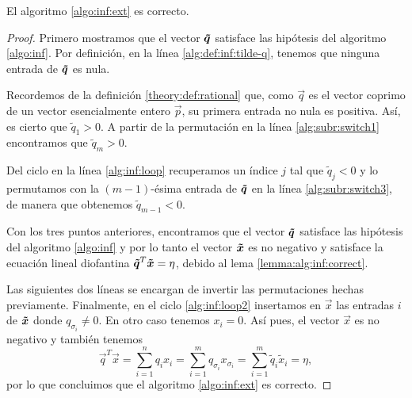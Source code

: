\begin{theorem}
	\label{th:alg:inf}
	El algoritmo \ref{algo:inf:ext} es correcto.
\end{theorem}
\begin{proof}
	Primero mostramos que el vector $\boldsymbol{\tilde{q}}$ satisface las hipótesis del algoritmo
	\ref{algo:inf}. Por definición, en la línea \ref{alg:def:inf:tilde-q}, tenemos que ninguna
	entrada de $\boldsymbol{\tilde{q}}$ es nula.

	Recordemos de la definición \ref{theory:def:rational} que, como $\vec{q}$ es el vector coprimo
	de un vector esencialmente entero $\vec{p}$, su primera entrada no nula es positiva. Así, es
	cierto que $\tilde{q}_1 > 0$. A partir de la permutación en la línea \ref{alg:subr:switch1}
	encontramos que $\tilde{q}_m > 0$.

	Del ciclo en la línea \ref{alg:inf:loop} recuperamos un índice $j$ tal que $\tilde{q}_j < 0$ y
	lo permutamos con la $(m - 1)$-ésima entrada de $\boldsymbol{\tilde{q}}$ en la línea
	\eqref{alg:subr:switch3}, de manera que obtenemos $\tilde{q}_{m-1} < 0$.

	Con los tres puntos anteriores, encontramos que el vector $\boldsymbol{\tilde{q}}$ satisface las
	hipótesis del algoritmo \ref{algo:inf} y por lo tanto el vector $\boldsymbol{\tilde{x}}$ es no negativo
	y satisface la ecuación lineal diofantina $\boldsymbol{\tilde{q}}^T\boldsymbol{\tilde{x}} = \eta$, debido al
	lema \ref{lemma:alg:inf:correct}.

	Las siguientes dos líneas se encargan de invertir las permutaciones hechas previamente.
	Finalmente, en el ciclo \eqref{alg:inf:loop2} insertamos en $\vec{x}$ las entradas $i$ de
	$\boldsymbol{\tilde{x}}$ donde $q_{\sigma_i} \neq 0$. En otro caso tenemos $x_i = 0$. Así pues, el
	vector $\vec{x}$ es no negativo y también tenemos
	\begin{equation*}
		\vec{q}^T\vec{x} = \sum_{i = 1}^{n}q_ix_i
		= \sum_{i = 1}^{m}q_{\sigma_i}x_{\sigma_i}
		= \sum_{i = 1}^{m}\tilde{q}_i\tilde{x}_i
		= \eta,
	\end{equation*}
	por lo que concluimos que el algoritmo \ref{algo:inf:ext} es correcto.
\end{proof}

